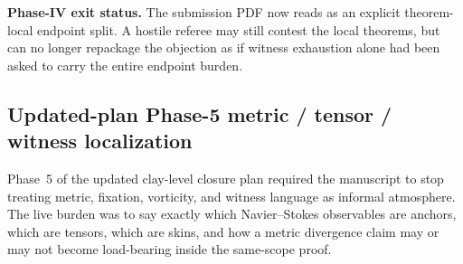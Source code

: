 \noindent\textbf{Phase-IV exit status.} The submission PDF now reads as an explicit theorem-local endpoint split. A hostile referee may still contest the local theorems, but can no longer repackage the objection as if witness exhaustion alone had been asked to carry the entire endpoint burden.

\subsection*{Updated-plan Phase-5 metric / tensor / witness localization}
Phase~5 of the updated clay-level closure plan required the manuscript to stop treating metric, fixation, vorticity, and witness language as informal atmosphere. The live burden was to say exactly which Navier--Stokes observables are anchors, which are tensors, which are skins, and how a metric divergence claim may or may not become load-bearing inside the same-scope proof.

